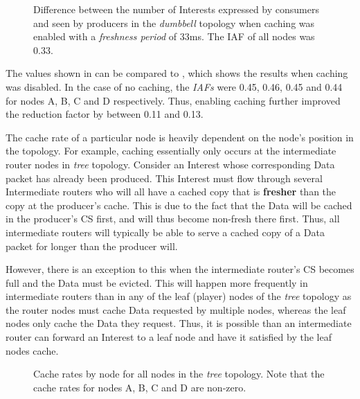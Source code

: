 \begin{figure}[H]
    \centering
    \caption{Difference between the number of Interests expressed by consumers and seen by producers in the \textit{dumbbell} topology when caching was enabled with a \textit{freshness period} of 33ms. The IAF of all nodes was 0.33.}
    \label{fig:eval:caching:interest-agg-dumbbell}
\end{figure}

The values shown in  can be compared to , which shows the results when caching was disabled. In the case of no caching, the \textit{IAFs} were 0.45, 0.46, 0.45 and 0.44 for nodes A, B, C and D respectively. Thus, enabling caching further improved the reduction factor by between 0.11 and 0.13.

The cache rate of a particular node is heavily dependent on the node's position in the topology. For example, caching essentially only occurs at the intermediate router nodes in \textit{tree} topology. Consider an Interest whose corresponding Data packet has already been produced. This Interest must flow through several Intermediate routers who will all have a cached copy that is \textbf{fresher} than the copy at the producer's cache. This is due to the fact that the Data will be cached in the producer's CS first, and will thus become non-fresh there first. Thus, all intermediate routers will typically be able to serve a cached copy of a Data packet for longer than the producer will. 

However, there is an exception to this when the intermediate router's CS becomes full and the Data must be evicted. This will happen more frequently in intermediate routers than in any of the leaf (player) nodes of the \textit{tree} topology as the router nodes must cache Data requested by multiple nodes, whereas the leaf nodes only cache the Data they request. Thus, it is possible than an intermediate router can forward an Interest to a leaf node and have it satisfied by the leaf nodes cache.

\begin{figure}[H]
    \centering
    \caption{Cache rates by node for all nodes in the \textit{tree} topology. Note that the cache rates for nodes A, B, C and D are non-zero.}
    \label{fig:eval:caching:cache-rate-tree}
\end{figure}

